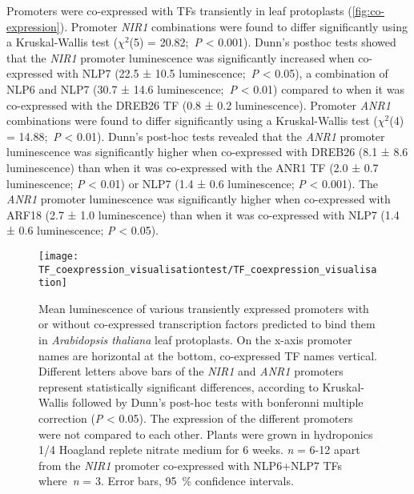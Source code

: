 Promoters were co\hyp{}expressed with TFs transiently in leaf protoplasts (\autoref{fig:co-expression}). Promoter \textit{NIR1} combinations were found to differ significantly using a Kruskal-Wallis test ($\chi^2$(5) = 20.82;~\textit{P} \textless{} 0.001).
Dunn's posthoc tests showed that the \textit{NIR1} promoter luminescence was significantly increased when co\hyp{}expressed with NLP7 (22.5 ± 10.5 luminescence;~\textit{P} \textless{} 0.05), a combination of NLP6 and NLP7 (30.7 ± 14.6 luminescence;~\textit{P} \textless{} 0.01) compared to when it was co\hyp{}expressed with the DREB26 TF (0.8 ± 0.2 luminescence).
Promoter \textit{ANR1} combinations were found to differ significantly using a Kruskal-Wallis test ($\chi^2$(4) = 14.88;~\textit{P} \textless{} 0.01).
Dunn's post-hoc tests revealed that the \textit{ANR1} promoter luminescence was significantly higher when co\hyp{}expressed with DREB26 (8.1 ± 8.6 luminescence) than when it was co\hyp{}expressed with the ANR1 TF (2.0 ± 0.7 luminescence; \textit{P} \textless{} 0.01) or NLP7 (1.4 ± 0.6 luminescence; \textit{P} \textless{} 0.001).
The \textit{ANR1} promoter luminescence was significantly higher when co\hyp{}expressed with ARF18 (2.7 ± 1.0 luminescence) than when it was co\hyp{}expressed with NLP7 (1.4 ± 0.6 luminescence; \textit{P} \textless{} 0.05).

\begin{figure}[!h]
\begin{center}
\capstart
\texttt{[image: TF\_coexpression\_visualisationtest/TF\_coexpression\_visualisation]}
\caption{
Mean luminescence of various transiently expressed promoters with or without co\hyp{}expressed transcription factors predicted to bind them in \textit{Arabidopsis thaliana} leaf protoplasts.
On the x\hyp{}axis promoter names are horizontal at the bottom, co\hyp{}expressed TF names vertical. Different letters above bars of the \textit{NIR1} and \textit{ANR1} promoters represent statistically significant differences, according to Kruskal-Wallis followed by Dunn's post-hoc tests with bonferonni multiple correction (\textit{P} \textless{} 0.05). The expression of the different promoters were not compared to each other.
Plants were grown in hydroponics 1/4 Hoagland replete nitrate medium for 6 weeks.
\textit{n} = 6\hyp{}12 apart from the \textit{NIR1} promoter co\hyp{}expressed with NLP6+NLP7 TFs where~\textit{n} = 3.
Error bars, \SI{95}{\percent} confidence intervals.
\label{fig:co-expression}
}
\end{center}
\end{figure}

